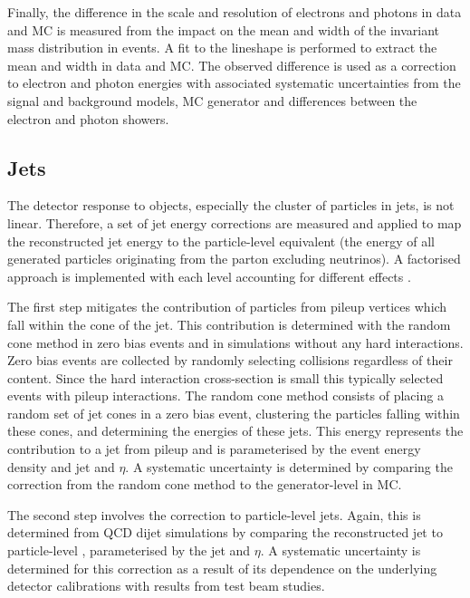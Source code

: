 Finally, the difference in the scale and resolution of electrons and photons
in data and MC is measured from the impact on the mean and width of the
invariant mass distribution in \IDYee events. A fit to the \PZ lineshape is
performed to extract the mean and width in data and MC. The observed
difference is used as a correction to electron and photon energies with
associated systematic uncertainties from the signal and background models, MC
generator and differences between the electron and photon showers.



\subsection{Jets}

The detector response to objects, especially the cluster of particles in jets,
is not linear. Therefore, a set of jet energy corrections are measured and
applied to map the reconstructed jet energy to the particle-level equivalent
(the energy of all generated particles originating from the parton excluding
neutrinos). A factorised approach is implemented with each level accounting
for different effects \cite{Khachatryan:2016kdb}.

The first step mitigates the contribution of particles from pileup vertices
which fall within the cone of the jet. This contribution is determined with
the random cone method in zero bias events and in simulations without any hard
interactions. Zero bias events are collected by randomly selecting collisions
regardless of their content. Since the hard interaction cross-section is small
this typically selected events with pileup interactions. The random cone
method consists of placing a random set of jet cones in a zero bias event,
clustering the particles falling within these cones, and determining the
energies of these jets. This energy represents the contribution to a jet from
pileup and is parameterised by the event energy density and jet \pt and
$\eta$. A systematic uncertainty is determined by comparing the correction
from the random cone method to the generator-level in MC.

The second step involves the correction to particle-level jets. Again, this is
determined from QCD dijet simulations by comparing the reconstructed jet \pt
to particle-level \pt, parameterised by the jet \pt and $\eta$. A systematic
uncertainty is determined for this correction as a result of its dependence on
the underlying detector calibrations with results from test beam studies.

